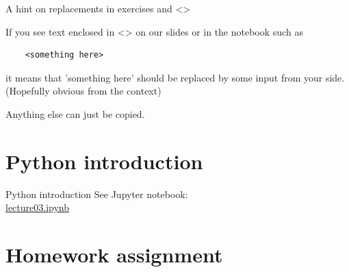 \begin{frame}[fragile]{A hint on replacements in exercises and <>}
	
	If you see text enclosed in <> on our slides or in the notebook such as
	\begin{verbatim}
	<something here>
	\end{verbatim}
	it means that 'something here' should be replaced by some input from your side. (Hopefully obvious from the context)
	
	Anything else can just be copied.

\end{frame}

\section{Python introduction}
\begin{frame}[fragile]{Python introduction}
    See Jupyter notebook:\\
    \href{https://github.com/inwe-boku/lecture-scientific-computing/blob/master/lecture03-python-introduction/lecture03.ipynb}{lecture03.ipynb}
\end{frame}


\section{Homework assignment}

